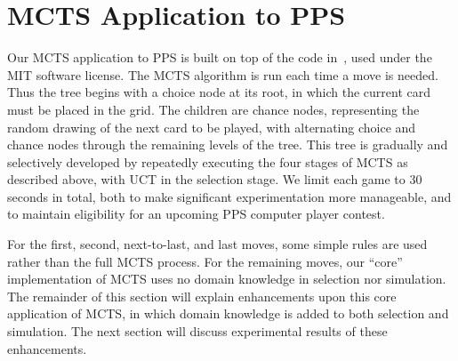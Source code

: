 \documentclass[letterpaper]{article}
\begin{document}
\section{MCTS Application to PPS}


Our MCTS application to PPS is built on top of the code in~\cite{hughart2012uct}, used under the MIT software license. The MCTS algorithm is run each time a move is needed. Thus the tree begins with a choice node at its root, in which the current card must be placed in the grid. The children are chance nodes, representing the random drawing of the next card to be played, with alternating choice and chance nodes through the remaining levels of the tree. This tree is gradually and selectively developed by repeatedly executing the four stages of MCTS as described above, with UCT in the selection stage. We limit each game to 30 seconds in total, both to make significant experimentation more manageable, and to maintain eligibility for an upcoming PPS computer player contest. 

For the first, second, next-to-last, and last moves, some simple rules are used rather than the full MCTS process. For the remaining moves, our ``core'' implementation of MCTS uses no domain knowledge in selection nor simulation. The remainder of this section will explain enhancements upon this core application of MCTS, in which domain knowledge is added to both selection and simulation. The next section will discuss experimental results of these enhancements.
\end{document}

